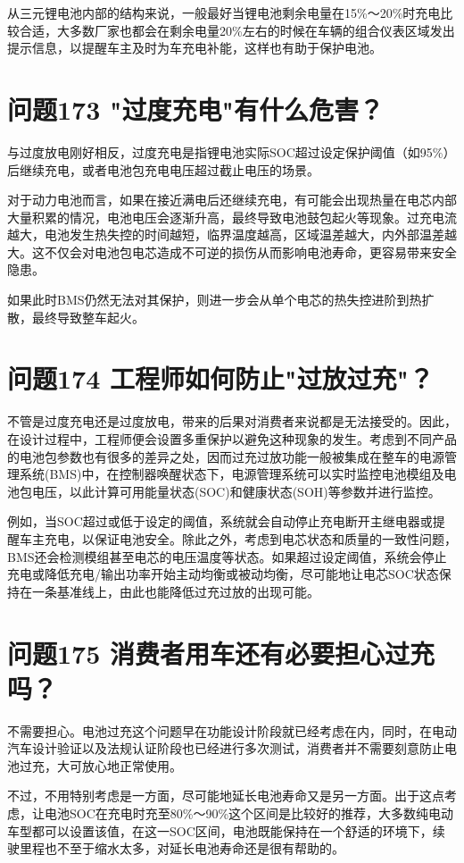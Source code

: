 \documentclass[12pt,UTF8]{ctexbook}
\begin{document}
从三元锂电池内部的结构来说，一般最好当锂电池剩余电量在15\%～20\%时充电比较合适，大多数厂家也都会在剩余电量20\%左右的时候在车辆的组合仪表区域发出提示信息，以提醒车主及时为车充电补能，这样也有助于保护电池。

\section{问题173 "过度充电"有什么危害？}

与过度放电刚好相反，过度充电是指锂电池实际SOC超过设定保护阈值（如95\%）后继续充电，或者电池包充电电压超过截止电压的场景。

对于动力电池而言，如果在接近满电后还继续充电，有可能会出现热量在电芯内部大量积累的情况，电池电压会逐渐升高，最终导致电池鼓包起火等现象。过充电流越大，电池发生热失控的时间越短，临界温度越高，区域温差越大，内外部温差越大。这不仅会对电池包电芯造成不可逆的损伤从而影响电池寿命，更容易带来安全隐患。

如果此时BMS仍然无法对其保护，则进一步会从单个电芯的热失控进阶到热扩散，最终导致整车起火。

\section{问题174 工程师如何防止"过放过充"？}

不管是过度充电还是过度放电，带来的后果对消费者来说都是无法接受的。因此，在设计过程中，工程师便会设置多重保护以避免这种现象的发生。考虑到不同产品的电池包参数也有很多的差异之处，因而过充过放功能一般被集成在整车的电源管理系统(BMS)中，在控制器唤醒状态下，电源管理系统可以实时监控电池模组及电池包电压，以此计算可用能量状态(SOC)和健康状态(SOH)等参数并进行监控。

例如，当SOC超过或低于设定的阈值，系统就会自动停止充电断开主继电器或提醒车主充电，以保证电池安全。除此之外，考虑到电芯状态和质量的一致性问题，BMS还会检测模组甚至电芯的电压温度等状态。如果超过设定阈值，系统会停止充电或降低充电/输出功率开始主动均衡或被动均衡，尽可能地让电芯SOC状态保持在一条基准线上，由此也能降低过充过放的出现可能。

\section{问题175 消费者用车还有必要担心过充吗？}

不需要担心。电池过充这个问题早在功能设计阶段就已经考虑在内，同时，在电动汽车设计验证以及法规认证阶段也已经进行多次测试，消费者并不需要刻意防止电池过充，大可放心地正常使用。

不过，不用特别考虑是一方面，尽可能地延长电池寿命又是另一方面。出于这点考虑，让电池SOC在充电时充至80\%～90\%这个区间是比较好的推荐，大多数纯电动车型都可以设置该值，在这一SOC区间，电池既能保持在一个舒适的环境下，续驶里程也不至于缩水太多，对延长电池寿命还是很有帮助的。
\end{document}
